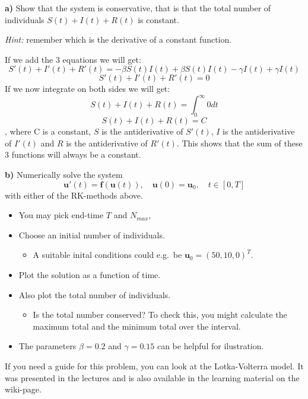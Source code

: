 \documentclass[11pt]{article}
\providecommand{\tightlist}{%
      \setlength{\itemsep}{0pt}\setlength{\parskip}{0pt}}
\begin{document}
    \textbf{a)} Show that the system is conservative, that is that the total
number of individuals \(S(t)+I(t)+R(t)\) is constant.

\emph{Hint:} remember which is the derivative of a constant function.

    If we add the 3 equations we will get:
\[S'(t) + I'(t) + R'(t) = - \beta S(t)I(t) + \beta S(t)I(t) - \gamma I(t) + \gamma I(t)\]
\[S'(t) + I'(t) + R'(t) = 0 \] If we now integrate on both sides we will
get: \[ S(t) + I(t) + R(t) = \int_0^{\infty} 0 dt\]
\[ S(t) + I(t) + R(t) = C \], where C is a constant, \(S\) is the
antiderivative of \(S'(t)\), \(I\) is the antiderivative of \(I'(t)\)
and \(R\) is the antiderivative of \(R'(t)\). This shows that the sum of
these 3 functions will always be a constant.

    \textbf{b)} Numerically solve the system \[
\mathbf{u}'(t) = \mathbf{f}(\mathbf{u}(t)),\quad \mathbf{u}(0) = \mathbf{u}_0,\quad t\in [0,T]
\] with either of the RK-methods above.

\begin{itemize}
\tightlist
\item
  You may pick end-time \(T\) and \(N_{max}\),
\item
  Choose an initial number of individuals.

  \begin{itemize}
  \tightlist
  \item
    A suitable inital conditions could e.g.~be
    \(\mathbf{u}_0 = (50,10,0)^T\).
  \end{itemize}
\item
  Plot the solution as a function of time.
\item
  Also plot the total number of individuals.

  \begin{itemize}
  \tightlist
  \item
    Is the total number conserved? To check this, you might calculate
    the maximum total and the minimum total over the interval.
  \end{itemize}
\item
  The parameters \(\beta=0.2\) and \(\gamma=0.15\) can be helpful for
  ilustration.
\end{itemize}

If you need a guide for this problem, you can look at the Lotka-Volterra
model. It was presented in the lectures and is also available in the
learning material on the wiki-page.
\end{document}
